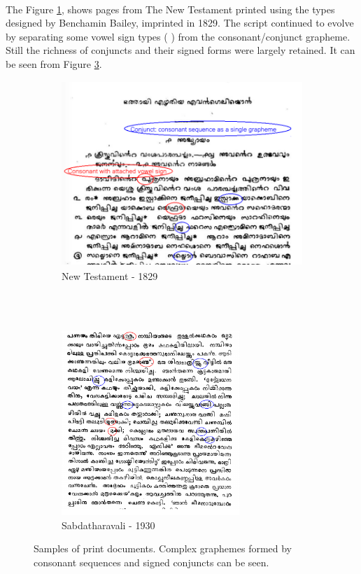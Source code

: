 \documentclass[10pt]{article}
\begin{document}
\paragraph{}
The Figure \ref{newtestament}, shows pages from The New Testament printed using the types designed by Benchamin Bailey, imprinted in 1829\cite{babucherian}. The script continued to evolve by separating some vowel sign types ({ }) from the consonant/conjunct grapheme. Still the richness of conjuncts and their signed forms were largely retained. It can be seen from Figure \ref{Sabdatharavali}. 

\begin{figure}[h!]

\begin{subfigure}{0.8\textwidth}
 \centering
 \includegraphics[width=\linewidth, height=7cm]{images/newtestament1829.png}
 \caption{New Testament - 1829}
 \label{newtestament}
\end{subfigure}
\\ \\
\begin{subfigure}{0.8\textwidth}
 \centering
 \includegraphics[width=\linewidth,height=7cm]{images/1930-Sabdatharavali.png}
 \caption{Sabdatharavali - 1930 }
 \label{Sabdatharavali}
\end{subfigure}
\caption{Samples of print documents. Complex graphemes formed by consonant sequences and signed conjuncts can be seen.}
\end{figure}
\end{document}
